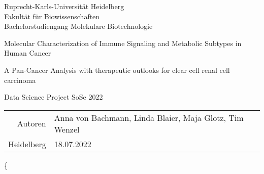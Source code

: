 \documentclass[
  parskip,
  oneside]{scrreprt}
\author{}
\date{\vspace{-2.5em}}
\begin{document}
\begin{titlepage}
\centering
    {\Large Ruprecht-Karls-Universität Heidelberg\\
        Fakultät für Biowissenschaften\\
        Bachelorstudiengang Molekulare Biotechnologie\\}

    {}
    {

        {\huge Molecular Characterization of Immune Signaling and Metabolic Subtypes in Human Cancer}

        {\Huge }
        
        {\LARGE A Pan-Cancer Analysis with therapeutic outlooks for clear cell renal cell carcinoma}

    }

    {\Large Data Science Project SoSe 2022}


    {\Large
        \begin{tabular}{rl}
            Autoren & Anna von Bachmann, Linda Blaier, Maja Glotz, Tim Wenzel\\
            Heidelberg &18.07.2022\\
        \end{tabular}
    }


\end{titlepage}


\tableofcontents


\small\{
\end{document}
